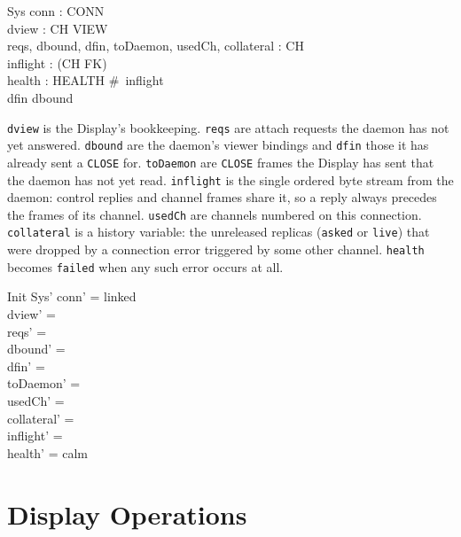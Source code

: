 \documentclass[a4paper,10pt,fleqn]{article}
\begin{document}
\begin{schema}{Sys}
  conn : CONN \\
  dview : CH \pfun VIEW \\
  reqs, dbound, dfin, toDaemon, usedCh, collateral : \power CH \\
  inflight : \seq (CH \cross FK) \\
  health : HEALTH
\where
  \#~inflight  \\
  dfin \subseteq dbound
\end{schema}

\texttt{dview} is the Display's bookkeeping.  \texttt{reqs} are attach
requests the daemon has not yet answered.  \texttt{dbound} are the daemon's
viewer bindings and \texttt{dfin} those it has already sent a
\texttt{CLOSE} for.  \texttt{toDaemon} are \texttt{CLOSE} frames the Display
has sent that the daemon has not yet read.  \texttt{inflight} is the single
ordered byte stream from the daemon: control replies and channel frames share
it, so a reply always precedes the frames of its channel.
\texttt{usedCh} are channels numbered on this connection.
\texttt{collateral} is a history variable: the unreleased replicas
(\texttt{asked} or \texttt{live}) that were dropped by a connection error
triggered by some other channel.  \texttt{health} becomes \texttt{failed}
when any such error occurs at all.

\begin{schema}{Init}
  Sys'
\where
  conn' = linked \\
  dview' = \emptyset \\
  reqs' = \emptyset \\
  dbound' = \emptyset \\
  dfin' = \emptyset \\
  toDaemon' = \emptyset \\
  usedCh' = \emptyset \\
  collateral' = \emptyset \\
  inflight' = \langle \rangle \\
  health' = calm
\end{schema}

\section{Display Operations}
\end{document}

